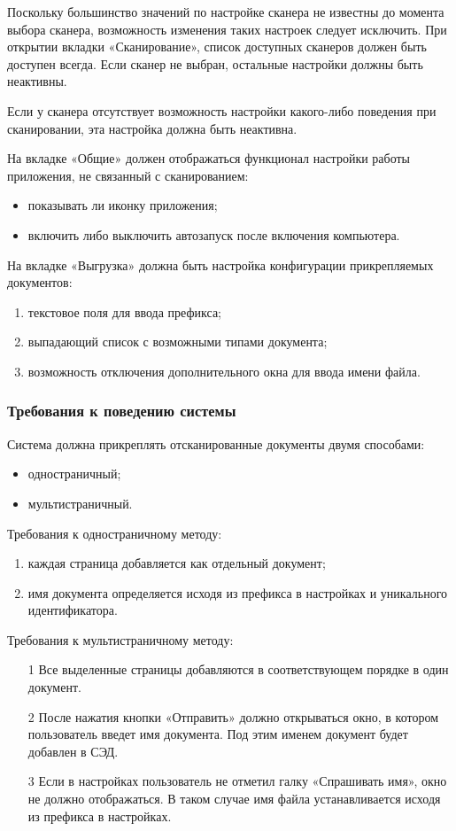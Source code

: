 Поскольку большинство значений по настройке сканера не известны до момента выбора сканера, возможность изменения таких настроек следует исключить. При открытии вкладки «Сканирование», список доступных сканеров должен быть доступен всегда. Если сканер не выбран, остальные настройки должны быть неактивны.

Если у сканера отсутствует возможность настройки какого-либо поведения при сканировании, эта настройка должна быть неактивна.

На вкладке «Общие» должен отображаться функционал настройки работы приложения, не связанный с сканированием:
\begin{itemize}
	\item показывать ли иконку приложения;
	\item включить либо выключить автозапуск после включения компьютера.
\end{itemize}

На вкладке «Выгрузка» должна быть настройка конфигурации прикрепляемых документов:
\begin{enumerate}
	\item текстовое поля для ввода префикса;
	\item выпадающий список с возможными типами документа;
	\item возможность отключения дополнительного окна для ввода имени файла.
\end{enumerate}

\subsubsection{Требования к поведению системы}
\label{sub:requirements:func_rec:requirements_system}

Система должна прикреплять отсканированные документы двумя способами:
\begin{itemize}
	\item одностраничный;
	\item мультистраничный.
\end{itemize}

Требования к одностраничному методу:
\begin{enumerate}
	\item каждая страница добавляется как отдельный документ;
	\item имя документа определяется исходя из префикса в настройках и уникального идентификатора.
\end{enumerate}

Требования к мультистраничному методу:
\begin{enumerate}
	\item[1] Все выделенные страницы добавляются в соответствующем порядке в один документ.
	\item[2] После нажатия кнопки «Отправить» должно открываться окно, в котором пользователь введет имя документа. Под этим именем документ будет добавлен в СЭД.
	\item[3] Если в настройках пользователь не отметил галку «Спрашивать имя», окно не должно отображаться. В таком случае имя файла устанавливается исходя из префикса в настройках.
\end{enumerate}

